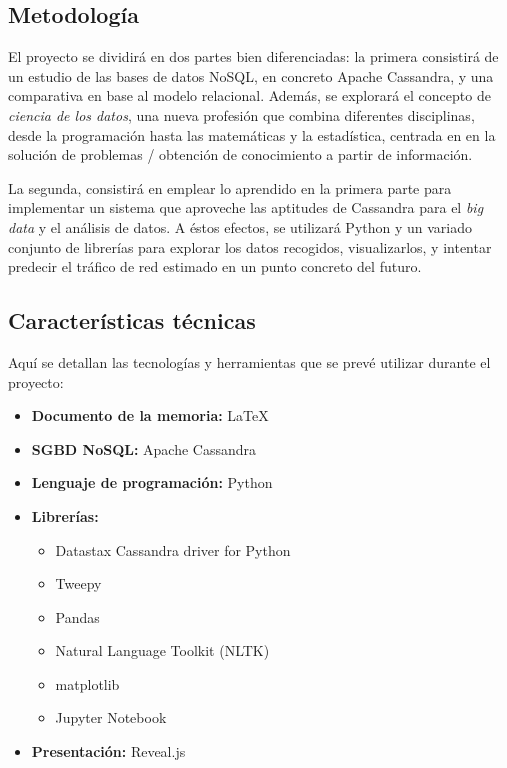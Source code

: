 \subsection{Metodología}
\label{subsec:metodologia}

El proyecto se dividirá en dos partes bien diferenciadas: la primera consistirá
de un estudio de las bases de datos NoSQL, en concreto Apache Cassandra, y una
comparativa en base al modelo relacional. Además, se explorará el concepto de
\emph{ciencia de los datos}, una nueva profesión que combina diferentes
disciplinas, desde la programación hasta las matemáticas y la estadística,
centrada en en la solución de problemas / obtención de conocimiento a partir de información.

La segunda, consistirá en emplear lo aprendido en la primera parte para
implementar un sistema que aproveche las aptitudes de Cassandra para el
\emph{big data} y el análisis de datos. A éstos efectos, se utilizará Python y
un variado conjunto de librerías para explorar los datos recogidos,
visualizarlos, y intentar predecir el tráfico de red estimado en un punto
concreto del futuro.

\subsection{Características técnicas}
\label{subsec:planificació}

Aquí se detallan las tecnologías y herramientas que se prevé
utilizar durante el proyecto:

\begin{itemize}
    \item \textbf{Documento de la memoria: } \LaTeX
    \item \textbf{SGBD NoSQL: } Apache Cassandra
    \item \textbf{Lenguaje de programación: } Python 
    \item \textbf{Librerías: } 
      \begin{itemize}
      \item Datastax Cassandra driver for Python
      \item Tweepy
      \item Pandas
      \item Natural Language Toolkit (NLTK)
      \item matplotlib
      \item Jupyter Notebook
      \end{itemize}
    \item \textbf{Presentación: } Reveal.js\\
\end{itemize}

